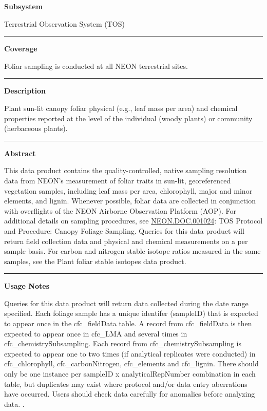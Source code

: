 \documentclass[]{article}
\begin{document}
\textbf{Subsystem}

Terrestrial Observation System (TOS)

\begin{center}\rule{0.5\linewidth}{\linethickness}\end{center}

\textbf{Coverage}

Foliar sampling is conducted at all NEON terrestrial sites.

\begin{center}\rule{0.5\linewidth}{\linethickness}\end{center}

\textbf{Description}

Plant sun-lit canopy foliar physical (e.g., leaf mass per area) and
chemical properties reported at the level of the individual (woody
plants) or community (herbaceous plants).

\begin{center}\rule{0.5\linewidth}{\linethickness}\end{center}

\textbf{Abstract}

This data product contains the quality-controlled, native sampling
resolution data from NEON's measurement of foliar traits in sun-lit,
georeferenced vegetation samples, including leaf mass per area,
chlorophyll, major and minor elements, and lignin. Whenever possible,
foliar data are collected in conjunction with overflights of the NEON
Airborne Observation Platform (AOP). For additional details on sampling
procedures, see
\href{http://data.neonscience.org/api/v0/documents/NEON.DOC.001024vD}{NEON.DOC.001024}:
TOS Protocol and Procedure: Canopy Foliage Sampling. Queries for this
data product will return field collection data and physical and chemical
measurements on a per sample basis. For carbon and nitrogen stable
isotope ratios measured in the same samples, see the Plant foliar stable
isotopes data product.

\begin{center}\rule{0.5\linewidth}{\linethickness}\end{center}

\textbf{Usage Notes}

Queries for this data product will return data collected during the date
range specified. Each foliage sample has a unique identifer (sampleID)
that is expected to appear once in the cfc\_fieldData table. A record
from cfc\_fieldData is then expected to appear once in cfc\_LMA and
several times in cfc\_chemistrySubsampling. Each record from
cfc\_chemistrySubsampling is expected to appear one to two times (if
analytical replicates were conducted) in cfc\_chlorophyll,
cfc\_carbonNitrogen, cfc\_elements and cfc\_lignin. There should only be
one instance per sampleID x analyticalRepNumber combination in each
table, but duplicates may exist where protocol and/or data entry
aberrations have occurred. Users should check data carefully for
anomalies before analyzing data. \newpage
.
\end{document}
